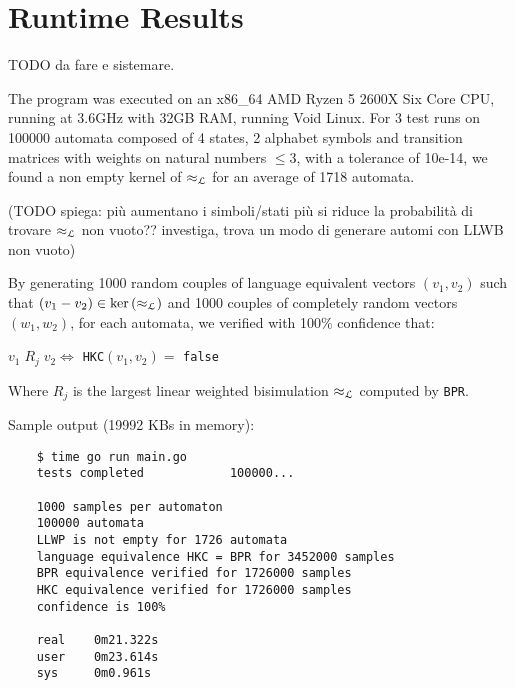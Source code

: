 \section{Runtime Results}

TODO da fare e sistemare.

The program was executed on an x86\_64 AMD Ryzen 5 2600X Six Core CPU, running at 3.6GHz with 32GB RAM, 
running Void Linux. 
For 3 test runs on 100000 automata composed of 4 states, 2 alphabet symbols and transition
matrices with weights on natural numbers $\leq 3$, with a tolerance of 10e-14,
we found a non empty kernel of $\approx_{\mathcal{L}}$ for an average of 1718 automata.

(TODO spiega: più aumentano i simboli/stati più si riduce la probabilità di 
trovare $\approx_{\mathcal{L}}$ non vuoto?? investiga, trova un modo di generare automi con LLWB 
non vuoto)

By generating 1000 random couples of language equivalent vectors $(v_1, v_2)$ such that
$(v_1 - v_2) \in \text{ker}\left(\approx_{\mathcal{L}}\right)$ and 1000 couples of completely random vectors
$(w_1, w_2)$, for each automata, we verified with 100\% confidence that:

\begin{center}
    $v_1 \; R_j \; v_2 \iff$ \texttt{HKC}$(v_1, v_2) =$ \texttt{false}
\end{center}

Where $R_j$ is the largest linear weighted bisimulation $\approx_{\mathcal{L}}$ computed by \texttt{BPR}.


Sample output (19992 KBs in memory):
\begin{verbatim}
    $ time go run main.go 
    tests completed            100000...
    
    1000 samples per automaton
    100000 automata
    LLWP is not empty for 1726 automata
    language equivalence HKC = BPR for 3452000 samples
    BPR equivalence verified for 1726000 samples
    HKC equivalence verified for 1726000 samples
    confidence is 100%
    
    real    0m21.322s
    user    0m23.614s
    sys     0m0.961s
\end{verbatim}